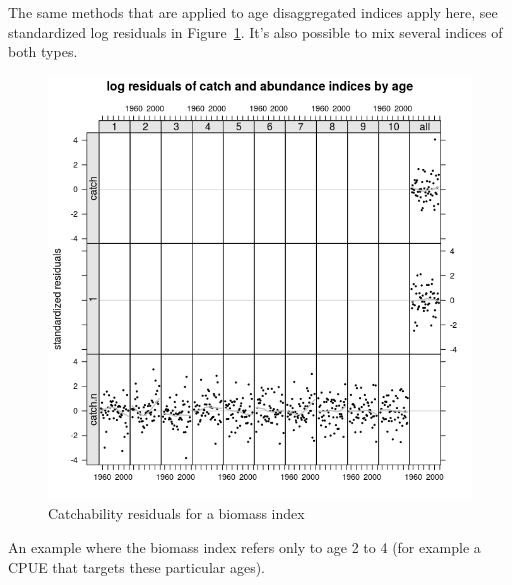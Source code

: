 \documentclass[a4paper,english,10pt]{article}\usepackage[]{graphicx}\usepackage[]{color}
\newenvironment{knitrout}{}{} %
\begin{document}
The same methods that are applied to age disaggregated indices apply here, see standardized log residuals in Figure~\ref{fig:resbio}. It's also possible to mix several indices of both types.

\begin{knitrout}
\color{fgcolor}\begin{figure}[H]

{\centering \includegraphics[width=.9\linewidth]{figure/resbio-1} 

}

\caption[Catchability residuals for a biomass index]{Catchability residuals for a biomass index}\label{fig:resbio}
\end{figure}


\end{knitrout}

An example where the biomass index refers only to age 2 to 4 (for example a CPUE that targets these particular ages).
\end{document}
